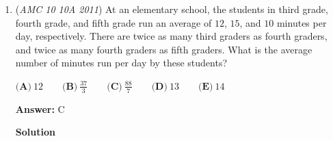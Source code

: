 \begin{enumerate}
 Like before, the difference between the two sequences is $Y-X=102-12=92.$




\textbf{Solution 2}

We see that every number in Y's sequence is two more than every corresponding number in X's sequence. Since there are 46 numbers in each sequence, the difference must be$46\cdot 2=\boxed{92}$




\textbf{Solution 3}


 \begin{align*} X&=10+12+14+\cdots +100 \\ Y&=X-10+102 = X+92 \\  Y-X &= (X+92)-X \\      &= \boxed{92} \quad \quad \textbf{(A)}\\ \end{align*}


 
- $\text{herobrine-india}$




\textbf{Solution 4}

In an actual contest, this would probably take too much time but is nevertheless a solution.The general formula for computing sums of any arithmetic sequence where $x$ is the number of terms, $f$ is the first term and $l$ is the last term is $\frac{(f+l)x}{2}$. If one uses that formula for both sequences, they will get $2530$ as the sum for $X$ and $2622$ as the sum for $Y$.Subtracting $X$ from $Y$, one will get the answer $\boxed{92 \text{\textbf{ (A)}}}$.- danfan

 


 


	\item (\textit{AMC 10 10A 2011}) At an elementary school, the students in third grade, fourth grade, and fifth grade run an average of $12$, $15$, and $10$ minutes per day, respectively. There are twice as many third graders as fourth graders, and twice as many fourth graders as fifth graders. What is the average number of minutes run per day by these students? 


 $\textbf{(A)}\ 12 \qquad\textbf{(B)}\  \frac{37}{3} \qquad\textbf{(C)}\  \frac{88}{7} \qquad\textbf{(D)}\ 13\qquad\textbf{(E)}\ 14$

 \textbf{Answer: }C



\textbf{Solution}


\end{enumerate}
